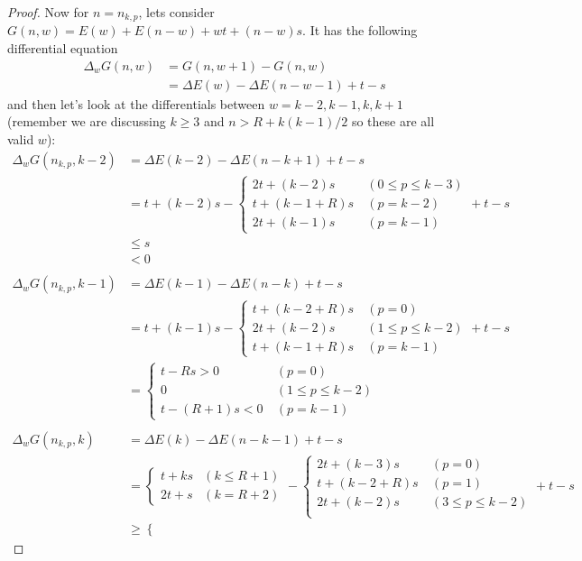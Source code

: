\documentclass[]{article}
\begin{document}
\begin{proof}
Now for $n = n_{k, p}$, lets consider $G(n, w) = E(w) + E(n-w) + wt + (n-w)s$. It has the following differential equation
\begin{align*}
\Delta_w G(n, w) &= G(n, w+1)-G(n, w) \\
&= \Delta E(w) - \Delta E(n-w-1) + t -s
\end{align*}
and then let's look at the differentials between $w = k-2, k-1, k, k+1$ (remember we are discussing $k\geq3$ and $n > R + k(k-1)/2 $ so these are all valid $w$):
\begin{align*}
\Delta_w G(n_{k,p}, k-2) &=  \Delta E(k-2) - \Delta E(n-k+1) + t -s \\
&= t+(k-2)s - \begin{cases}
2t + (k-2)s\ &(0\leq p \leq k-3)\\
t + (k-1+R)s\ &(p = k-2)\\
2t + (k-1)s\ &(p = k-1)
\end{cases} + t-s\\
&\leq s \\
&< 0 \\ \\
\Delta_w G(n_{k,p}, k-1) &=  \Delta E(k-1) - \Delta E(n-k) + t -s \\
&= t+(k-1)s - \begin{cases}
t + (k-2+R)s\ &(p =0)\\
2t + (k-2)s\ &(1\leq p\leq k-2)\\
t + (k-1+R)s\ &(p = k-1)
\end{cases} + t-s\\
&= \begin{cases}
t -Rs > 0\ &(p =0)\\
0\ &(1\leq p \leq k-2)\\
t -(R+1)s < 0\ &(p = k-1)
\end{cases}\\ \\ 
\Delta_w G(n_{k,p}, k) &=  \Delta E(k) - \Delta E(n-k-1) + t -s \\
&= \begin{cases}
t+ks &(k \leq R + 1)\\
2t+s&(k = R + 2)
\end{cases} - \begin{cases}
2t + (k-3)s\ &(p =0)\\
t + (k-2+R)s\ &(p =1)\\
2t + (k-2)s\ &(3\leq p \leq k-2)\\
\end{cases} + t-s\\
&\geq \begin{cases}

\end{cases}
\end{align*}
\end{proof}
\end{document}

